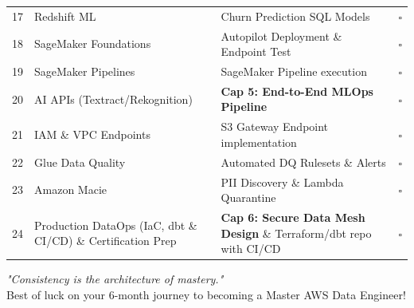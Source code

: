 \documentclass[11pt, a4paper]{article}
\begin{document}
\begin{center}
\begin{longtable}{@{} c l p{7cm} c @{}}
\midrule
17 & Redshift ML & Churn Prediction SQL Models & $\square$ \\
18 & SageMaker Foundations & Autopilot Deployment \& Endpoint Test & $\square$ \\
19 & SageMaker Pipelines & SageMaker Pipeline execution & $\square$ \\
20 & AI APIs (Textract/Rekognition)& \textbf{Cap 5: End-to-End MLOps Pipeline} & $\square$ \\
\midrule
21 & IAM \& VPC Endpoints & S3 Gateway Endpoint implementation & $\square$ \\
22 & Glue Data Quality & Automated DQ Rulesets \& Alerts & $\square$ \\
23 & Amazon Macie & PII Discovery \& Lambda Quarantine & $\square$ \\
24 & Production DataOps (IaC, dbt \& CI/CD) \& Certification Prep & \textbf{Cap 6: Secure Data Mesh Design} \& Terraform/dbt repo with CI/CD & $\square$ \\

\end{longtable}
\end{center}

\vspace{1cm}
\begin{center}
    \textit{"Consistency is the architecture of mastery."} \\
    Best of luck on your 6-month journey to becoming a Master AWS Data Engineer!
\end{center}
\end{document}
